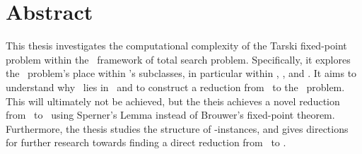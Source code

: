 \chapter*{Abstract}

This thesis investigates the computational complexity of the Tarski fixed-point problem within the \TFNP\ framework of total search problem. Specifically, it explores the \Tarski\ problem's place within \TFNP's subclasses, in particular within \PPAD, \PLS, and \EOPL\@. It aims to understand why \Tarski\ lies in \EOPL\ and to construct a reduction from \Tarski\ to the \EndOfPotentialLine\ problem. This will ultimately not be achieved, but the theis achieves a novel reduction from \Tarski\ to \EndOfLine\ using Sperner's Lemma instead of Brouwer's fixed-point theorem. Furthermore, the thesis studies the structure of \Tarski-instances, and gives directions for further research towards finding a direct reduction from \Tarski\ to \EndOfPotentialLine\@.